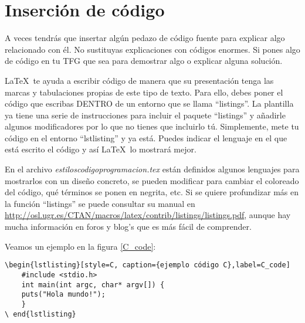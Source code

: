 \section{Inserción de código}
A veces tendrás que insertar algún pedazo de código fuente para explicar algo relacionado con él. No sustituyas explicaciones con códigos enormes. Si pones algo de código en tu TFG que sea para demostrar algo o explicar alguna solución.

\LaTeX~te ayuda a escribir código de manera que su presentación tenga las marcas y tabulaciones propias de este tipo de texto. Para ello, debes poner el código que escribas DENTRO de un entorno  que se llama ``listings''.  La plantilla ya tiene una serie de instrucciones para incluir el paquete ``listings'' y añadirle algunos modificadores por lo que no tienes que incluirlo tú. Simplemente, mete tu código en el entorno ``lstlisting'' y ya está. Puedes indicar el lenguaje en el que está escrito el código y así \LaTeX~lo mostrará mejor. 
\\
\par En el archivo \textit{estiloscodigoprogramacion.tex} están definidos algunos lenguajes para mostrarlos con un diseño concreto, se pueden modificar para cambiar el coloreado del código, qué términos se ponen en negrita, etc.
Si se quiere profundizar más en la función ``listings'' se puede consultar su manual en \url{http://osl.ugr.es/CTAN/macros/latex/contrib/listings/listings.pdf}, aunque hay mucha información en foros y blog's que es más fácil de comprender.

\par Veamos un ejemplo en la figura \ref{C_code}:

\begin{lstlisting}[style=Latex-color]
\begin{lstlisting}[style=C, caption={ejemplo código C},label=C_code]
	#include <stdio.h>
	int main(int argc, char* argv[]) {
  	puts("Hola mundo!");
	}
\ end{lstlisting}	
\end{lstlisting}

